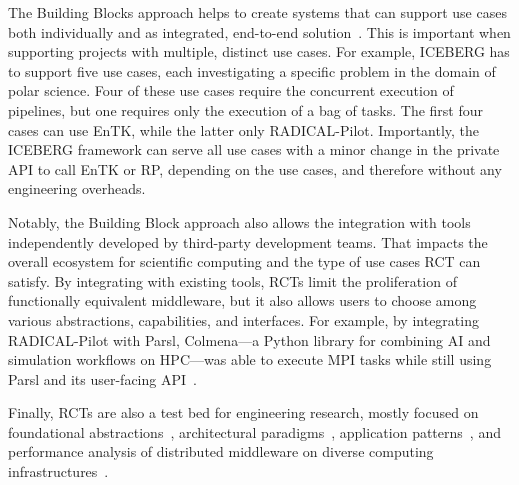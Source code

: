\documentclass[preprint,12pt, a4paper]{elsarticle}
\begin{document}
The Building Blocks approach helps to create systems that can support use cases
both individually and as integrated, end-to-end
solution~\cite{turilli2019middleware}. This is important when supporting
projects with multiple, distinct use cases. For example, ICEBERG has to support
five use cases, each investigating a specific problem in the domain of polar
science. Four of these use cases require the concurrent execution of pipelines,
but one requires only the execution of a bag of tasks. The first four cases can
use EnTK, while the latter only RADICAL-Pilot. Importantly, the ICEBERG
framework can serve all use cases with a minor change in the private API to call
EnTK or RP, depending on the use cases, and therefore without any engineering
overheads.

Notably, the Building Block approach also allows the integration with tools
independently developed by third-party development teams. That impacts the
overall ecosystem for scientific computing and the type of use cases RCT can
satisfy. By integrating with existing tools, RCTs limit the proliferation of
functionally equivalent middleware, but it also allows users to choose among
various abstractions, capabilities, and interfaces. For example, by integrating
RADICAL-Pilot with Parsl, Colmena---a Python library for combining AI and
simulation workflows on HPC---was able to execute MPI tasks while still using
Parsl and its user-facing API~\cite{alsaadi2022radical}.


Finally, RCTs are also a test bed for engineering research, mostly focused on
foundational abstractions~\cite{turilli2017evaluating}, architectural
paradigms~\cite{turilli2018comprehensive}, application
patterns~\cite{balasubramanian2016extasy,balasubramanian2018harnessing}, and
performance analysis of distributed middleware on diverse computing
infrastructures~\cite{turilli2017evaluating,dakka2018high}.

\end{document}
